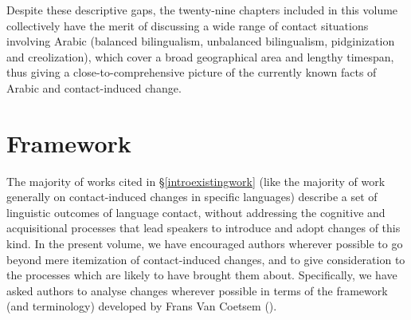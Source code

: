 \documentclass[output=paper]{langsci/langscibook}
\begin{document}
Despite these descriptive gaps, the twenty-nine chapters included in this volume collectively have the merit of discussing a wide range of contact situations involving Arabic (balanced bilingualism, unbalanced bilingualism, pidginization and creolization), which cover a broad geographical area and lengthy timespan, thus giving a close-to-comprehensive picture of the currently known facts of Arabic and contact-induced change.

\section{Framework}\label{introvc}
The majority of works cited in §\ref{introexistingwork} (like the majority of work generally on contact-induced changes in specific languages) describe a set of linguistic outcomes of language contact, without addressing the cognitive and acquisitional processes that lead speakers to introduce and adopt changes of this kind. In the present volume, we have encouraged authors wherever possible to go beyond mere itemization of contact-induced changes, and to give consideration to the processes which are likely to have brought them about. Specifically, we have asked authors to analyse changes wherever possible in terms of the framework (and terminology) developed by Frans Van Coetsem (\citeyear{VanCoetsem1988,VanCoetsem2000}).
\end{document}
